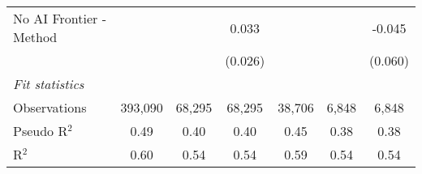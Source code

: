 \begin{tabular}{lcccccc}
   No AI Frontier - Method &               &               & 0.033         &               &              & -0.045\\   
                           &               &               & (0.026)       &               &              & (0.060)\\   
   \midrule
   \emph{Fit statistics}\\
   Observations            & 393,090       & 68,295        & 68,295        & 38,706        & 6,848        & 6,848\\  
   Pseudo R$^2$            & 0.49          & 0.40          & 0.40          & 0.45          & 0.38         & 0.38\\  
   R$^2$                   & 0.60          & 0.54          & 0.54          & 0.59          & 0.54         & 0.54\\  
   

\end{tabular}
